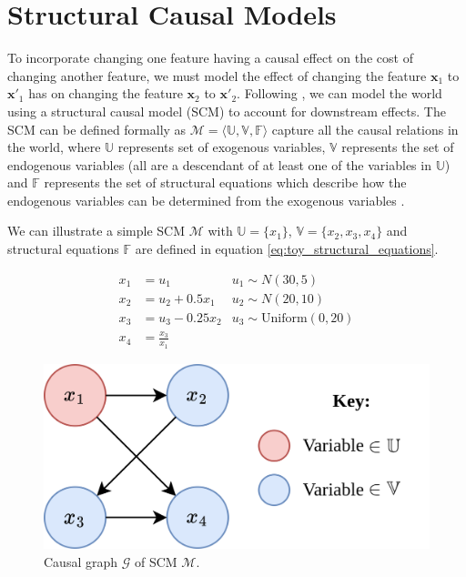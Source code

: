 \section{Structural Causal Models} \label{section:scms}

To incorporate changing one feature having a causal effect on the cost of changing another feature, we must model the effect of changing the feature $\mathbf{x}_1$ to $\mathbf{x'}_1$ has on changing the feature $\mathbf{x}_2$ to $\mathbf{x'}_2$. Following \textcite{karimiAlgorithmicRecourseCounterfactual2021}, we can model the world using a structural causal model (SCM) to account for downstream effects. The SCM can be defined formally as $\mathcal{M} = \langle\mathbb{U, V, F}\rangle$ capture all the causal relations in the world, where $\mathbb{U}$ represents set of exogenous variables, $\mathbb{V}$ represents the set of endogenous variables (all are a descendant of at least one of the variables in $\mathbb{U}$) and $\mathbb{F}$ represents the set of structural equations which describe how the endogenous variables can be determined from the exogenous variables \citep{pearl2016causal}.

We can illustrate a simple SCM $\mathcal{M}$ with $\mathbb{U} = \{x_1\}$, $\mathbb{V} = \{x_2, x_3, x_4\}$ and structural equations $\mathbb{F}$ are defined in equation \ref{eq:toy_structural_equations}.

\begin{align} \label{eq:toy_structural_equations}
	x_1 & = u_1 & u_1 \sim N(30 , 5) \\ \nonumber %
	x_2 & = u_2 + 0.5x_1 & u_2 \sim N(20, 10) \\ \nonumber %
	x_3 & = u_3 - 0.25x_2 & u_3 \sim \text{Uniform}(0, 20) \\ \nonumber %
	x_4 & = \frac{x_3}{x_1} %
\end{align}


\begin{figure}[!htb]
	\centering
	\includegraphics[width=0.6\linewidth]{images/draw.io/Simple SCM.png}
	\caption{Causal graph $\mathcal{G}$ of SCM $\mathcal{M}$.}
	\label{fig:toy_scm}
\end{figure}


